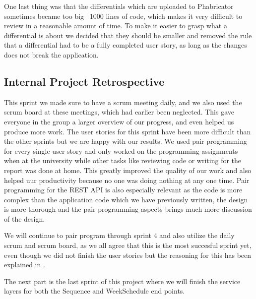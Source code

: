 One last thing was that the differentials which are uploaded to Phabricator sometimes became too big ~1000 lines of code, which makes it very difficult to review in a reasonable amount of time.
To make it easier to grasp what a differential is about we decided that they should be smaller and removed the rule that a differential had to be a fully completed user story, as long as the changes does not break the application.

\subsection*{Internal Project Retrospective}
This sprint we made sure to have a scrum meeting daily, and we also used the scrum board at these meetings, which had earlier been neglected.
This gave everyone in the group a larger overview of our progress, and even helped us produce more work.
The user stories for this sprint have been more difficult than the other sprints but we are happy with our results.
We used pair programming for every single user story and only worked on the programming assignments when at the university while other tasks like reviewing code or writing for the report was done at home.
This greatly improved the quality of our work and also helped uur productivity because no one was doing nothing at any one time.
Pair programming for the REST API is also especially relevant as the code is more complex than the application code which we have previously written, the design is more thorough and the pair programming aspects brings much more discussion of the design.

We will continue to pair program through sprint 4 and also utilize the daily scrum and scrum board, as we all agree that this is the most succesful sprint yet, even though we did not finish the user stories but the reasoning for this has been explained in .

The next part is the last sprint of this project where we will finish the service layers for both the Sequence and WeekSchedule end points.